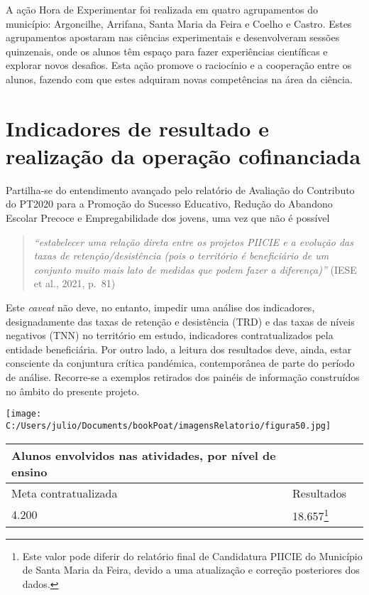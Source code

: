\documentclass[
]{book}
\begin{document}
A ação Hora de Experimentar foi realizada em quatro agrupamentos do município: Argoncilhe, Arrifana, Santa Maria da Feira e Coelho e Castro. Estes agrupamentos apostaram nas ciências experimentais e desenvolveram sessões quinzenais, onde os alunos têm espaço para fazer experiências científicas e explorar novos desafios. Esta ação promove o raciocínio e a cooperação entre os alunos, fazendo com que estes adquiram novas competências na área da ciência.

\hypertarget{indicadores-de-resultado-e-realizauxe7uxe3o-da-operauxe7uxe3o-cofinanciada}{%
\section{\texorpdfstring{\textbf{Indicadores de resultado e realização da operação cofinanciada}}{Indicadores de resultado e realização da operação cofinanciada}}\label{indicadores-de-resultado-e-realizauxe7uxe3o-da-operauxe7uxe3o-cofinanciada}}

Partilha-se do entendimento avançado pelo relatório de Avaliação do Contributo do PT2020 para a Promoção do Sucesso Educativo, Redução do Abandono Escolar Precoce e Empregabilidade dos jovens, uma vez que não é possível

\begin{quote}
\emph{``estabelecer uma relação direta entre os projetos PIICIE e a evolução das taxas de retenção/desistência (pois o território é beneficiário de um conjunto muito mais lato de medidas que podem fazer a diferença)''} (IESE et al., 2021, p.~81)
\end{quote}

Este \emph{caveat} não deve, no entanto, impedir uma análise dos indicadores, designadamente das taxas de retenção e desistência (TRD) e das taxas de níveis negativos (TNN) no território em estudo, indicadores contratualizados pela entidade beneficiária. Por outro lado, a leitura dos resultados deve, ainda, estar consciente da conjuntura crítica pandémica, contemporânea de parte do período de análise. Recorre-se a exemplos retirados dos painéis de informação construídos no âmbito do presente projeto.

\texttt{[image: C:/Users/julio/Documents/bookPoat/imagensRelatorio/figura50.jpg]}

\begin{longtable}[]{@{}lll@{}}
\toprule()
Alunos envolvidos nas atividades, por nível de ensino & & \\
\midrule()
\endhead
Meta contratualizada & Resultados & \\
4.200 & 18.657\footnote{Este valor pode diferir do relatório final de Candidatura PIICIE do Município de Santa Maria da Feira, devido a uma atualização e correção posteriores dos dados.} & \\
\bottomrule()
\end{longtable}
\end{document}
